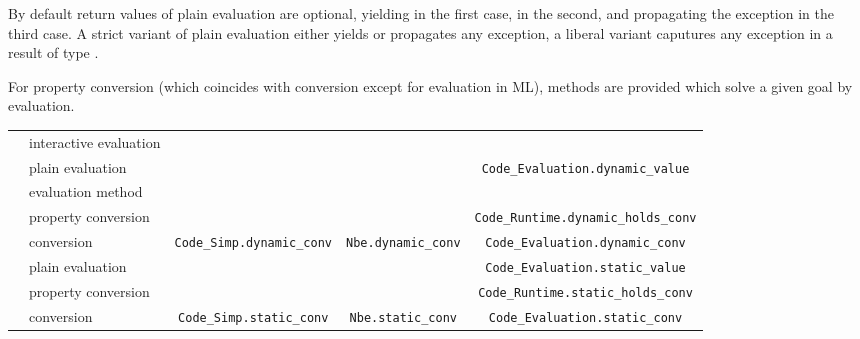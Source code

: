 \begin{isabellebody}
\begin{isamarkuptext}
  By default return values of plain evaluation are optional, yielding
   in the first case,  in the
  second, and propagating the exception in the third case.  A strict
  variant of plain evaluation either yields  or propagates
  any exception, a liberal variant caputures any exception in a result
  of type .
  
  For property conversion (which coincides with conversion except for
  evaluation in ML), methods are provided which solve a given goal by
  evaluation.%
\end{isamarkuptext}%
\isamarkuptrue%
%
\isamarkuptrue%
%
\begin{isamarkuptext}%
\newcommand{\ttsize}{\fontsize{5.8pt}{8pt}\selectfont}
  \fontsize{9pt}{12pt}\selectfont
  \begin{tabular}{ll||c|c|c}
    & & \isa{simp} & \isa{nbe} & \isa{code} \tabularnewline \hline \hline
    \multirow{5}{1ex}{\rotatebox{90}{dynamic}}
      & interactive evaluation 
      & \hyperlink{command.value}{\mbox{\isa{\isacommand{value}}}} \isa{{\isaliteral{5B}{\isacharbrackleft}}simp{\isaliteral{5D}{\isacharbrackright}}} & \hyperlink{command.value}{\mbox{\isa{\isacommand{value}}}} \isa{{\isaliteral{5B}{\isacharbrackleft}}nbe{\isaliteral{5D}{\isacharbrackright}}} & \hyperlink{command.value}{\mbox{\isa{\isacommand{value}}}} \isa{{\isaliteral{5B}{\isacharbrackleft}}code{\isaliteral{5D}{\isacharbrackright}}}
      \tabularnewline
    & plain evaluation & & & \ttsize\verb|Code_Evaluation.dynamic_value| \tabularnewline \cline{2-5}
    & evaluation method & \hyperlink{method.code-simp}{\mbox{\isa{code{\isaliteral{5F}{\isacharunderscore}}simp}}} & \hyperlink{method.normalization}{\mbox{\isa{normalization}}} & \hyperlink{method.eval}{\mbox{\isa{eval}}} \tabularnewline
    & property conversion & & & \ttsize\verb|Code_Runtime.dynamic_holds_conv| \tabularnewline \cline{2-5}
    & conversion & \ttsize\verb|Code_Simp.dynamic_conv| & \ttsize\verb|Nbe.dynamic_conv|
      & \ttsize\verb|Code_Evaluation.dynamic_conv| \tabularnewline \hline \hline
    \multirow{3}{1ex}{\rotatebox{90}{static}}
      & plain evaluation & & & \ttsize\verb|Code_Evaluation.static_value| \tabularnewline \cline{2-5}
    & property conversion & &
      & \ttsize\verb|Code_Runtime.static_holds_conv| \tabularnewline \cline{2-5}
    & conversion & \ttsize\verb|Code_Simp.static_conv|
      & \ttsize\verb|Nbe.static_conv|
      & \ttsize\verb|Code_Evaluation.static_conv|

\end{tabular}
\end{isamarkuptext}
\end{isabellebody}
